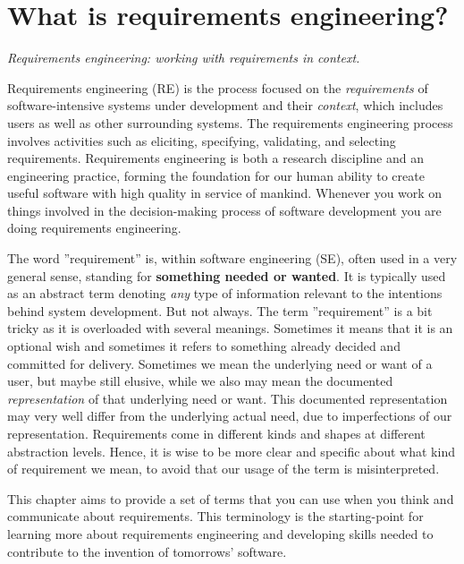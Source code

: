 
\chapter*{What is requirements engineering?}

\textit{Requirements engineering: working with requirements in context.}

\vspace{1em}

\noindent Requirements engineering (RE) is the process focused on the \textit{requirements} of software-intensive systems under development and their \textit{context}, which includes users as well as other surrounding systems. 
The requirements engineering process involves activities such as eliciting, specifying, validating, and selecting requirements. 
Requirements engineering is both a research discipline and an engineering practice, forming the foundation for our human ability to create useful software with high quality in service of mankind. Whenever you work on things involved in the decision-making process of software development you are doing requirements engineering.  

The word ''requirement'' is, within software engineering (SE), often used in a very general sense, standing for \textbf{something needed or wanted}. It is typically used as an abstract term denoting \textit{any} type of information relevant to the intentions behind system development. But not always. The term ''requirement'' is a bit tricky as it is overloaded with several meanings. Sometimes it means that it is an optional wish and sometimes it refers to something already decided and committed for delivery. Sometimes we mean the underlying need or want of a user, but maybe still elusive, while we also may mean the documented \textit{representation} of that underlying need or want. This documented representation may very well differ from the underlying actual need, due to imperfections of our representation. Requirements come in different kinds and shapes at different abstraction levels. Hence, it is wise to be more clear and specific about what kind of requirement we mean, to avoid that our usage of the term is misinterpreted. 

This chapter aims to provide a set of terms that you can use when you think and communicate about requirements. This terminology is the starting-point for learning more about requirements engineering and developing skills needed to contribute to the invention of tomorrows' software.

